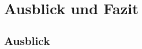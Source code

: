 \chapter{Ausblick und Fazit}\label{cha:AusblickUndFazit}

\lipsum[6]

\section{Ausblick}\label{sec:Ausblick}

\lipsum[6]

